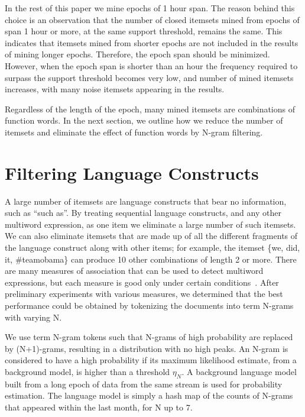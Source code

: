 \documentclass[letterpaper,12pt,titlepage,oneside,final]{book}
\begin{document}
In the rest of this paper we mine epochs of 1 hour span.
The reason behind this choice is an observation that the number of closed
itemsets mined from epochs of span 1 hour or more,
at the same support threshold, remains the same.
This indicates that itemsets mined from shorter epochs %
are not included in the results of mining longer epochs. 
Therefore, the epoch span should be minimized.
However, when the epoch span is shorter than an hour the frequency required
to surpass the support threshold becomes very low,
and number of mined itemsets increases, 
with many noise itemsets appearing in the results.


Regardless of the length of the epoch,
many mined itemsets are combinations of function words.
In the next section, we outline how we reduce the number of itemsets and
eliminate the effect of function words by N-gram filtering.

\section{Filtering Language Constructs}
\label{sec:ngrams}

A large number of itemsets are language constructs that bear no information,
such as ``such as''. 
By treating sequential language constructs, and any other multiword expression,
as one item we eliminate a large number of such itemsets.
We can also eliminate itemsets that are made up of all the different fragments
of the language construct along with other items;
for example, the itemset \{we, did, it, \#teamobama\} can produce 10 other combinations of
length 2 or more.
There are many measures of association that can be used to detect multiword
expressions, but each measure is good only under certain conditions~\cite{ramisch2012broad}.
After preliminary experiments with various measures, we determined that
the best performance
could be obtained by tokenizing the documents into term N-grams with varying N. 


We use term N-gram tokens such that N-grams of high probability are replaced by
(N+1)-grams, resulting in a distribution with no high peaks.  
An N-gram is considered to %
have a high probability if its maximum likelihood estimate, 
from a background model,
is higher than a threshold $\eta_N$. 
A background language model built from a long epoch of data 
from the same stream is used for probability estimation.
The language model is simply a hash map of the counts of 
N-grams that appeared within the last month, for N up to 7.
\end{document}
